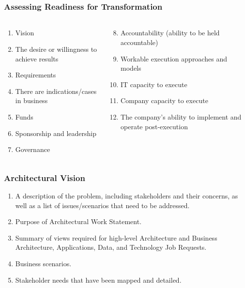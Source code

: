 \documentclass[aspectratio=169, table]{beamer}
\begin{document}
    \begin{frame}
        \frametitle{Assessing Readiness for Transformation}

        \framesubtitle{\hspace{1cm}}
        \begin{columns}
            \begin{column}{0.5\textwidth}
                \begin{enumerate}
                    \item Vision
                    \item The desire or willingness to achieve results
                    \item Requirements
                    \item There are indications/cases in business
                    \item Funds
                    \item Sponsorship and leadership
                    \item Governance

                \end{enumerate}
            \end{column}
            \begin{column}{0.5\textwidth}
                \begin{enumerate}
                    \setcounter{enumi}{7}
                    \item Accountability (ability to be held accountable)
                    \item Workable execution approaches and models
                    \item IT capacity to execute
                    \item Company capacity to execute
                    \item The company's ability to implement and operate post-execution
                \end{enumerate}
            \end{column}
        \end{columns}
    \end{frame}

    \begin{frame}
        \frametitle{Architectural Vision}
        \begin{enumerate}
            \item A description of the problem, including stakeholders and their concerns, as well as a list of issues/scenarios that need to be addressed.
            \item Purpose of Architectural Work Statement.
            \item Summary of views required for high-level Architecture and Business Architecture, Applications, Data, and Technology Job Requests.
            \item Business scenarios.
            \item Stakeholder needs that have been mapped and detailed.
        \end{enumerate}
    \end{frame}
\end{document}
